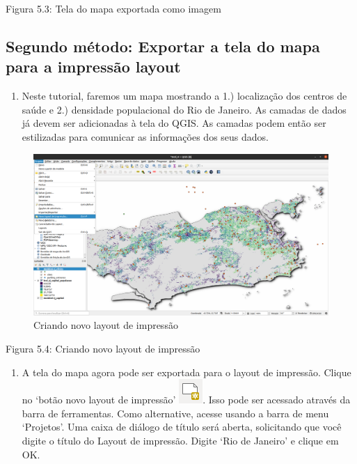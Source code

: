 \documentclass[
  portuguese,
]{krantz}
\providecommand{\tightlist}{%
  \setlength{\itemsep}{0pt}\setlength{\parskip}{0pt}}
\begin{document}
Figura 5.3: Tela do mapa exportada como imagem

\hypertarget{segundo-muxe9todo-exportar-a-tela-do-mapa-para-a-impressuxe3o-layout}{%
\subsection{\texorpdfstring{\textbf{Segundo método: Exportar a tela do mapa para a impressão layout}}{Segundo método: Exportar a tela do mapa para a impressão layout}}\label{segundo-muxe9todo-exportar-a-tela-do-mapa-para-a-impressuxe3o-layout}}

\begin{enumerate}
\def\labelenumi{\arabic{enumi}.}
\tightlist
\item
  Neste tutorial, faremos um mapa mostrando a 1.) localização dos centros de saúde e 2.) densidade populacional do Rio de Janeiro. As camadas de dados já devem ser adicionadas à tela do QGIS. As camadas podem então ser estilizadas para comunicar as informações dos seus dados.
\end{enumerate}

\begin{figure}
\centering
\includegraphics{media/modulo5/new-print-layout.png}
\caption{Criando novo layout de impressão}
\end{figure}

Figura 5.4: Criando novo layout de impressão

\begin{enumerate}
\def\labelenumi{\arabic{enumi}.}
\setcounter{enumi}{1}
\tightlist
\item
  A tela do mapa agora pode ser exportada para o layout de impressão. Clique no `botão novo layout de impressão' \includegraphics{media/modulo5/newprint_composer.png}. Isso pode ser acessado através da barra de ferramentas. Como alternative, acesse usando a barra de menu `Projetos'. Uma caixa de diálogo de título será aberta, solicitando que você digite o título do Layout de impressão. Digite `Rio de Janeiro' e clique em OK.
\end{enumerate}
\end{document}
